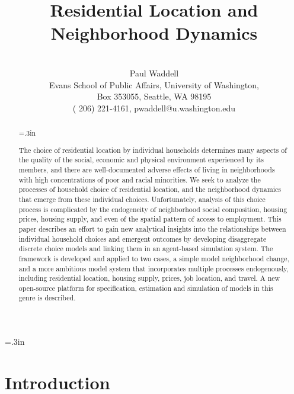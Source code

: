 \documentclass[12pt,a4paper]{article}
\begin{document}
\title{Residential Location and Neighborhood Dynamics}

\author{\\
Paul Waddell\\
Evans School of Public Affairs, University of Washington,\\
Box 353055, Seattle, WA 98195 \\
( 206) 221-4161, pwaddell@u.washington.edu} \maketitle


\baselineskip=.3in

\begin{abstract}
\baselineskip=.3in

The choice of residential location by individual households
determines many aspects of the quality of the social, economic and
physical environment experienced by its members, and there are
well-documented adverse effects of living in neighborhoods with
high concentrations of poor and racial minorities.  We seek to
analyze the processes of household choice of residential location,
and the neighborhood dynamics that emerge from these individual
choices.  Unfortunately, analysis of this choice process is
complicated by the endogeneity of neighborhood social composition,
housing prices, housing supply, and even of the spatial pattern of
access to employment. This paper describes an effort to gain new
analytical insights into the relationships between individual
household choices and emergent outcomes by developing disaggregate
discrete choice models and linking them in an agent-based
simulation system. The framework is developed and applied to two
cases, a simple model neighborhood change, and a more ambitious
model system that incorporates multiple processes endogenously,
including residential location, housing supply, prices, job
location, and travel.  A new open-source platform for
specification, estimation and simulation of models in this genre
is described.

\end{abstract}
\clearpage

\section{Introduction}
\end{document}
